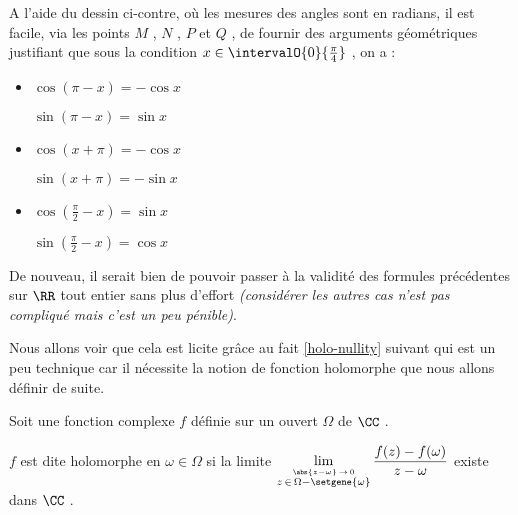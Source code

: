 \begin{wrapfigure}{r}{0.525\textwidth} 
	\vspace{-.75em}
	\begin{center}
	\end{center}
	\vspace{-3em}
\end{wrapfigure} 


A l'aide du dessin ci-contre, où les mesures des angles sont en radians, il est facile, via les points $M$ , $N$ , $P$ et $Q$ , de fournir des arguments géométriques justifiant que sous la condition $x\in \intervalO{0}{\frac{\pi}{4}}$ , on a :

\begin{itemize}[label=\small\textbullet]
	\item $\cos (\pi - x) = - \cos x$

	      \noindent
	      $\sin (\pi - x) = \sin x$ 

	\smallskip
	\item $\cos (x + \pi) = - \cos x$

	      \noindent
	      $\sin (x + \pi) = - \sin x$

	\smallskip
	\item $\cos \left( \frac{\pi}{2} - x \right) = \sin x$

	      \noindent
	      $\sin \left( \frac{\pi}{2} - x \right) = \cos x$ 
\end{itemize}


De nouveau, il serait bien de pouvoir passer à la validité des formules précédentes sur $\RR$ tout entier sans plus d'effort \emph{(considérer les autres cas n'est pas compliqué mais c'est un peu pénible)}.


\medskip

Nous allons voir que cela est licite grâce au fait \ref{holo-nullity} suivant qui est un peu technique car il nécessite la notion de fonction holomorphe que nous allons définir de suite.


\medskip

\begin{definition*}
	Soit une fonction complexe $f$ définie sur un ouvert $\Omega$ de $\CC$ .
	
	\smallskip
	
	$f$ est dite holomorphe en $\omega \in \Omega$ si la limite $\displaystyle \lim_{\stackrel{\abs{z - \omega} \, \rightarrow \, 0}{z \, \in \, \Omega - \setgene{\omega}}} \frac{f(z) - f(\omega)}{z - \omega}$ existe dans $\CC$ .
\end{definition*}


